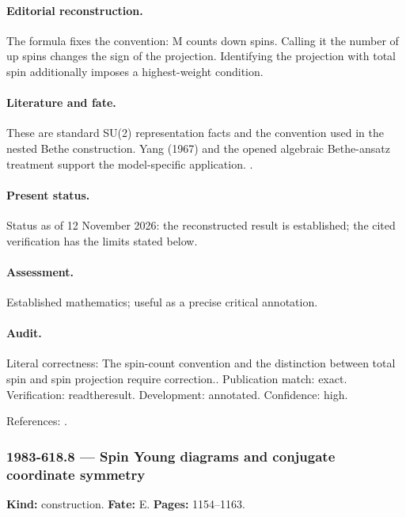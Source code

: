 \paragraph{Editorial reconstruction.} The formula fixes the convention: M counts down spins. Calling it the number of up spins changes the sign of the projection. Identifying the projection with total spin additionally imposes a highest-weight condition.

\paragraph{Literature and fate.} These are standard SU(2) representation facts and the convention used in the nested Bethe construction. Yang (1967) and the opened algebraic Bethe-ansatz treatment support the model-specific application. \citep{yang1967manybody,faddeev1996bethe}.

\paragraph{Present status.} Status as of 12 November 2026: the reconstructed result is established; the cited verification has the limits stated below.

\paragraph{Assessment.} Established mathematics; useful as a precise critical annotation.

\paragraph{Audit.} Literal correctness: The spin-count convention and the distinction between total spin and spin projection require correction.. Publication match: exact. Verification: readtheresult. Development: annotated. Confidence: high.

\noindent References: \citep{yang1967manybody,faddeev1996bethe}.\par

\subsubsection{1983-618.8 --- Spin Young diagrams and conjugate coordinate symmetry}

\label{item:1983-618.8}

\noindent\textbf{Kind:} construction. \textbf{Fate:} E. \textbf{Pages:} 1154--1163.\par

